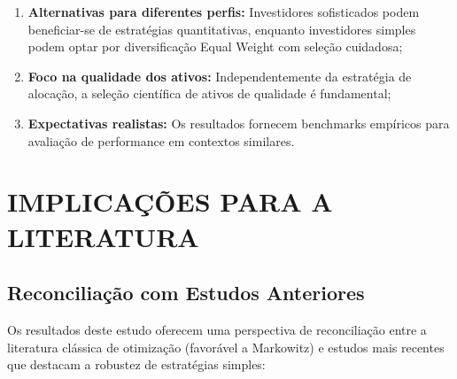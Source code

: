 \begin{enumerate}
    \item \textbf{Alternativas para diferentes perfis:} Investidores sofisticados podem beneficiar-se de estratégias quantitativas, enquanto investidores simples podem optar por diversificação Equal Weight com seleção cuidadosa;
    
    \item \textbf{Foco na qualidade dos ativos:} Independentemente da estratégia de alocação, a seleção científica de ativos de qualidade é fundamental;
    
    \item \textbf{Expectativas realistas:} Os resultados fornecem benchmarks empíricos para avaliação de performance em contextos similares.
\end{enumerate}

\section{IMPLICAÇÕES PARA A LITERATURA}

\subsection{Reconciliação com Estudos Anteriores}

Os resultados deste estudo oferecem uma perspectiva de reconciliação entre a literatura clássica de otimização (favorável a Markowitz) e estudos mais recentes que destacam a robustez de estratégias simples:


